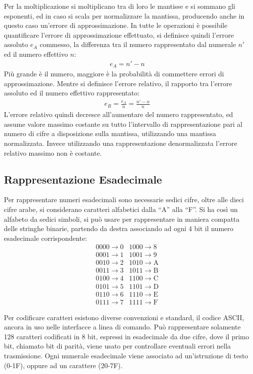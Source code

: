 \documentclass{article}
\numberwithin{equation}{subsection}
\begin{document}
Per la moltiplicazione si moltiplicano tra di loro le mantisse e si sommano gli esponenti, ed in caso si scala per normalizzare la mantissa, producendo anche in questo caso un'errore di approssimazione. 
In tutte le operazioni è possibile quantificare l'errore di approssimazione effettuato, si definisce quindi l'errore assoluto $e_A$ commesso, la differenza tra il numero rappresentato dal numerale $n'$ ed il numero effettivo 
$n$: 
\begin{gather*}
    e_A=n'-n
\end{gather*}
Più grande è il numero, maggiore è la probabilità di commettere errori di approssimazione. Mentre si definisce l'errore relativo, il rapporto tra l'errore assoluto ed il numero effettivo rappresentato:
\begin{gather*}
    e_R=\displaystyle\frac{e_A}{n}=\frac{n'-n}{n}
\end{gather*}
L'errore relativo quindi decresce all'aumentare del numero rappresentato, ed assume valore massimo costante su tutto l'intervallo di rappresentazione pari al numero di cifre a disposizione sulla mantissa, utilizzando 
una mantissa normalizzata. Invece utilizzando una rappresentazione denormalizzata l'errore relativo massimo non è costante. 

\subsection{Rappresentazione Esadecimale}

Per rappresentare numeri esadecimali sono necessarie sedici cifre, oltre alle dieci cifre arabe, si considerano caratteri alfabetici dalla ``A'' alla ``F''. Si ha così un alfabeto da sedici simboli, si può usare 
per rappresentare in maniera compatta delle stringhe binarie, partendo da destra associando ad ogni 4 bit il numero esadecimale corrispondente:
\begin{align*}
    &0000\to 0& 1000\to8&\\
    &0001 \to 1&1001\to9&\\
    &0010\to2&1010\to\mathrm{A}&\\
    &0011\to3&1011\to\mathrm{B}&\\
    &0100\to4&1100\to\mathrm{C}&\\
    &0101\to5&1101\to\mathrm{D}&\\
    &0110\to6&1110\to\mathrm{E}&\\
    &0111\to7&1111\to \mathrm{F}&
\end{align*}

Per codificare caratteri esistono diverse convenzioni e standard, il codice ASCII, ancora in uso nelle interfacce a linea di comando. Può rappresentare solamente 128 caratteri codificati in 8 bit, espressi in 
esadecimale da due cifre, dove il primo bit, chiamato bit di parità, viene usato per controllare eventuali errori nella trasmissione. Ogni numerale esadecimale viene associato ad un'istruzione di testo (0-1F), 
oppure ad un carattere (20-7F).
\end{document}
